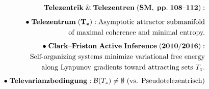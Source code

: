 \documentclass[preview]{standalone}
\begin{document}
\begin{align*}
\special{dvisvgm:raw <g id='unique000'>}\mathbf{Telezentrik\;\&\;Telezentren\;(SM,\;pp.\;108\text{--}112):}\\[5pt]\bullet\;\mathbf{Telezentrum\;(T_z):}\;\text{Asymptotic attractor submanifold}\\\;\;\text{of maximal coherence and minimal entropy.}\\[4pt]\bullet\;\mathbf{Clark\text{--}Friston\;Active\;Inference\;(2010/2016):}\\\;\;\text{Self-organizing systems minimize variational free energy}\\\;\;\text{along Lyapunov gradients toward attracting sets }T_z.\\[4pt]\bullet\;\mathbf{Televarianzbedingung:}\;\mathcal{B}(T_z)\neq\emptyset\text{ (vs. Pseudotelezentrisch)}\special{dvisvgm:raw </g>}
\end{align*}
\end{document}
